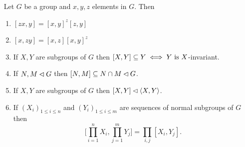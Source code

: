 \begin{prop}\label{commutator-props}${}$ Let\/ $G$ be a group and\/ $x,y,z$ elements in\/ $G$. Then
    \begin{enumerate}[\upshape a)]
        \item $[zx,y] = [x,y]^z[z,y]$
        \item $[x,zy] = [x,z][x,y]^z$
        \item If\/ $X,Y$ are subgroups of\/ $G$ then\/ $[X,Y] \subseteq Y \iff Y \text{\upshape\ is }X$-invariant.
        \item If\/ $N,M\lhd G$ then\/ $[N,M]\subseteq N\cap M\lhd G$.
        \item If\/ $X,Y$ are subgroups of\/ $G$ then\/ $[X,Y]\lhd\langle X,Y\rangle$.
        \item If\/ $(X_i)_{1\le i\le n}$ and\/ $(Y_i)_{1\le i\le m}$ are sequences of normal subgroups of\/ $G$ then
        $$
            \Big[\prod_{i=1}^nX_i,\prod_{j=1}^mY_j\Big]=\prod_{i,j}[X_i,Y_j].
        $$
    \end{enumerate}
\end{prop}

